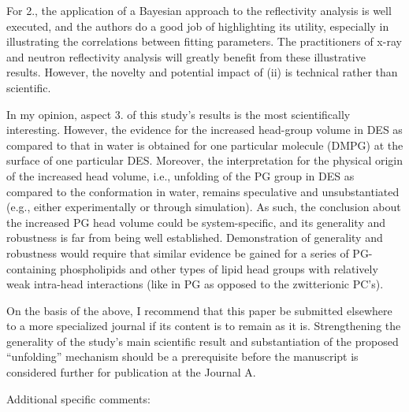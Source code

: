 \documentclass[amsmath,amssymb,twocolumn,superscriptaddress]{revtex4-1}
\begin{document}
For 2., the application of a Bayesian approach to the reflectivity analysis is well executed, and the authors do a good job of highlighting its utility, especially in illustrating the correlations between fitting parameters. The practitioners of x-ray and neutron reflectivity analysis will greatly benefit from these illustrative results. However, the novelty and potential impact of (ii) is technical rather than scientific.

In my opinion, aspect 3. of this study’s results is the most scientifically interesting. However, the evidence for the increased head-group volume in DES as compared to that in water is obtained for one particular molecule (DMPG) at the surface of one particular DES. Moreover, the interpretation for the physical origin of the increased head volume, i.e., unfolding of the PG group in DES as compared to the conformation in water, remains speculative and unsubstantiated (e.g., either experimentally or through simulation). As such, the conclusion about the increased PG head volume could be system-specific, and its generality and robustness is far from being well established. Demonstration of generality and robustness would require that similar evidence be gained for a series of PG-containing phospholipids and other types of lipid head groups with relatively weak intra-head interactions (like in PG as opposed to the zwitterionic PC’s).

On the basis of the above, I recommend that this paper be submitted elsewhere to a more specialized journal if its content is to remain as it is. Strengthening the generality of the study’s main scientific result and substantiation of the proposed ``unfolding'' mechanism should be a prerequisite before the manuscript is considered further for publication at the Journal A.

Additional specific comments:
\end{document}
